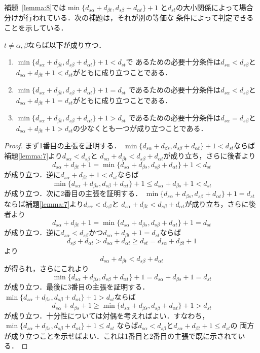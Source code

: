 補題~\ref{lemma:8}では$\min\{d_{s\alpha}+d_{\beta t}, d_{s\beta}+d_{\alpha t}\}+1$
と$d_{st}$の大小関係によって場合分けが行われている．次の補題は，それが別の等価な
条件によって判定できることを示している．

\begin{lemma}
$t \neq \alpha, \beta$ならば以下が成り立つ．
\begin{enumerate}
\item $\min\{d_{s\alpha}+d_{\beta t}, d_{s\beta}+d_{\alpha t}\}+1<d_{st}$で
あるための必要十分条件は$d_{s\alpha} < d_{s\beta}$と
$d_{s\alpha}+d_{\beta t}+1<d_{st}$がともに成り立つことである．
\item $\min\{d_{s\alpha}+d_{\beta t}, d_{s\beta}+d_{\alpha t}\}+1=d_{st}$
であるための必要十分条件は$d_{s\alpha} < d_{s\beta}$と 
$d_{s\alpha}+d_{\beta t}+1=d_{st}$がともに成り立つことである．
\item $\min\{d_{s\alpha}+d_{\beta t}, d_{s\beta}+d_{\alpha t}\}+1>d_{st}$
であるための必要十分条件は$d_{s\alpha}=d_{s\beta}$と$d_{s\alpha}+d_{\beta t}+1>d_{st}$の少なくとも一つが成り立つことである．
\end{enumerate}
\label{lemma:8b}
\end{lemma}
\begin{proof}
まず1番目の主張を証明する．
$\min\{d_{s\alpha}+d_{\beta s}, d_{s\beta}+d_{\alpha t}\}+1<d_{st}$ならば補題\ref{lemma:7}より$d_{s\alpha}<d_{s\beta}$と
$d_{s\alpha}+d_{\beta t}<d_{s\beta}+d_{\alpha t}$が成り立ち，さらに後者より
\[
d_{s\alpha}+d_{\beta t}+1=
 \min\{d_{s\alpha}+d_{\beta s}, d_{s\beta}+d_{\alpha t}\}+1<d_{st}
\]
が成り立つ．逆に$d_{s\alpha}+d_{\beta t}+1<d_{st}$ならば
\[
 \min\{d_{s\alpha}+d_{\beta s}, d_{s\beta}+d_{\alpha t}\}+1 \leq 
d_{s\alpha}+d_{\beta s}+1<d_{st}
\]
が成り立つ．次に2番目の主張を証明する．
$\min\{d_{s\alpha}+d_{\beta s}, d_{s\beta}+d_{\alpha t}\}+1=d_{st}$ならば補題\ref{lemma:7}より$d_{s\alpha}<d_{s\beta}$と
$d_{s\alpha}+d_{\beta t}<d_{s\beta}+d_{\alpha t}$が成り立ち，さらに後者より
\[
d_{s\alpha}+d_{\beta t}+1=
 \min\{d_{s\alpha}+d_{\beta s}, d_{s\beta}+d_{\alpha t}\}+1=d_{st}
\]
が成り立つ．逆に$d_{s\alpha}<d_{s\beta}$かつ$d_{s\alpha}+d_{\beta t}+1=d_{st}$ならば
\[
d_{s\beta}+d_{\alpha t}>d_{s\alpha}+d_{\alpha t} \geq d_{st}
=d_{s\alpha}+d_{\beta t}+1
\]
より
\[
 d_{s\alpha}+d_{\beta t} < d_{s\beta}+d_{\alpha t}
\]
が得られ，さらにこれより
\[
\min\{d_{s\alpha}+d_{\beta s}, d_{s\beta}+d_{\alpha t}\}+1=
d_{s\alpha}+d_{\beta s}+1=d_{st}
\]
が成り立つ．最後に3番目の主張を証明する．
$\min\{d_{s\alpha}+d_{\beta s}, d_{s\beta}+d_{\alpha t}\}+1>d_{st}$ならば
\[
 d_{s\alpha}+d_{\beta s}+1 \geq 
\min\{d_{s\alpha}+d_{\beta s}, d_{s\beta}+d_{\alpha t}\}+1>d_{st}
\]
が成り立つ．十分性については対偶を考えればよい．すなわち，
$\min\{d_{s\alpha}+d_{\beta s}, d_{s\beta}+d_{\alpha t}\}+1 \leq d_{st}$
ならば$d_{s\alpha}<d_{s\beta}$と$d_{s\alpha}+d_{\beta t}+1\leq d_{st}$の
両方が成り立つことを示せばよい．これは1番目と2番目の主張で既に示されている．
\end{proof}

